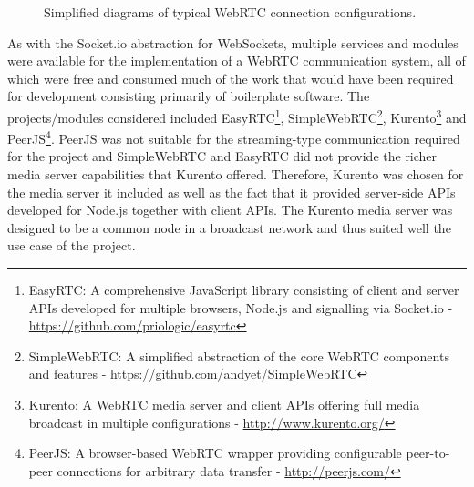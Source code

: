       \begin{figure}[h!]
      \centering
      \caption[Simplified diagrams of typical WebRTC connection configurations.]{Simplified diagrams of typical WebRTC connection configurations.}
      \label{fig:softDesign-webRTCBroadcastExamples}
      \end{figure}
      
      As with the Socket.io abstraction for WebSockets, multiple services and modules were available for the implementation of a WebRTC communication system, all of which were free and consumed much of the work that would have been required for development consisting primarily of boilerplate software. The projects/modules considered included EasyRTC\footnote{EasyRTC: A comprehensive JavaScript library consisting of client and server APIs developed for multiple browsers, Node.js and signalling via Socket.io - \url{https://github.com/priologic/easyrtc}}, SimpleWebRTC\footnote{SimpleWebRTC: A simplified abstraction of the core WebRTC components and features - \url{https://github.com/andyet/SimpleWebRTC}}, Kurento\footnote{Kurento: A WebRTC media server and client APIs offering full media broadcast in multiple configurations - \url{http://www.kurento.org/}} and PeerJS\footnote{PeerJS: A browser-based WebRTC wrapper providing configurable peer-to-peer connections for arbitrary data transfer - \url{http://peerjs.com/}}. PeerJS was not suitable for the streaming-type communication required for the project and SimpleWebRTC and EasyRTC did not provide the richer media server capabilities that Kurento offered. Therefore, Kurento was chosen for the media server it included as well as the fact that it provided server-side APIs developed for Node.js together with client APIs. The Kurento media server was designed to be a common node in a broadcast network and thus suited well the use case of the project.
      
